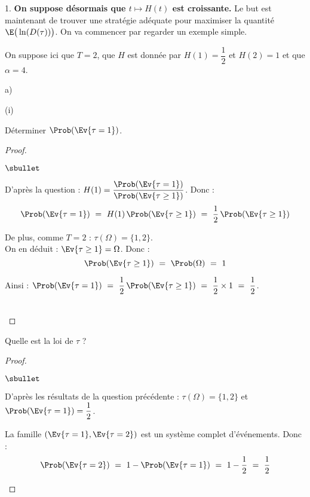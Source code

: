 \documentclass[11pt]{article}%
\begin{document}
\begin{noliste}{1.}
  \noindent
  {\bf On suppose désormais que $t \mapsto H(t)$ est croissante.} Le 
  but est maintenant de trouver une stratégie adéquate pour maximiser 
  la quantité $\E\big(\ln(D(\tau))\big)$. On va commencer par regarder 
  un exemple simple.
  
  \item On suppose ici que $T=2$, que $H$ est donnée par $H(1) =
  \dfrac{1}{2}$ et $H(2)=1$ et que $\alpha=4$.
  \begin{noliste}{a)}
    \setlength{\itemsep}{2mm}
    \item 
    \begin{nonoliste}{(i)}
      \item Déterminer $\Prob(\Ev{\tau=1})$.
      
      \begin{proof}~
        \begin{noliste}{$\sbullet$}
	  \item D'après la question  : $H(1) = 
	  \dfrac{\Prob(\Ev{\tau =1})}{\Prob(\Ev{\tau \geq 1})}$. Donc :
	  \[
	    \Prob(\Ev{\tau =1}) \ = \ H(1) \, \Prob(\Ev{\tau \geq 1})
	    \ = \ \dfrac{1}{2} \, \Prob(\Ev{\tau \geq 1})
	  \]
	  
	  \item De plus, comme $T=2$ : $\tau (\Omega) = \{1,2\}$.\\
	  On en déduit : $\Ev{\tau \geq 1} = \Omega$. Donc :
	  \[
	    \Prob(\Ev{\tau \geq 1}) \ = \ \Prob(\Omega) \ = \ 1
	  \]
	  
	  \item Ainsi : $\Prob(\Ev{\tau =1}) \ = \ \dfrac{1}{2} \,
	  \Prob(\Ev{\tau \geq 1}) \ = \  \dfrac{1}{2} \times 1 \ = \
	  \dfrac{1}{2}$.
        \end{noliste}
        ~\\[-1cm]
      \end{proof}
      
      

      
      \item Quelle est la loi de $\tau$ ?
      
      \begin{proof}~
        \begin{noliste}{$\sbullet$}
	  \item D'après les résultats de la question précédente : 
	  $\tau(\Omega) = \{1,2\}$ et $\Prob(\Ev{\tau=1}) = 
	  \dfrac{1}{2}$.
	  
	  \item La famille $(\Ev{\tau=1}, \Ev{\tau=2})$ est un 
	  système complet d'événements. Donc :
	  \[
	    \Prob(\Ev{\tau=2}) \ = \ 1-\Prob(\Ev{\tau =1}) \ = \ 1-
	    \dfrac{1}{2} \ = \ \dfrac{1}{2}
	  \]
	  

\end{noliste}
\end{proof}
\end{nonoliste}
\end{noliste}
\end{noliste}
\end{document}
